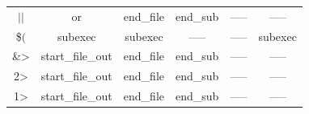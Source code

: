 \documentclass[12pt,a4paper]{report}
\begin{document}
\begin{table}[H]
\begin{tabular}{ |c|c|c|c|c|c| }
	$||$  & or & end\_file\cellcolor[HTML]{BEE9F9} &  end\_sub \cellcolor[HTML]{FFF49C}& ----- & ----- \\
	\$$($  & subexec\cellcolor[HTML]{C500FF} & subexec\cellcolor[HTML]{C500FF} &  ----- & ----- & subexec\cellcolor[HTML]{C500FF} \\
	\&>  & start\_file\_out \cellcolor[HTML]{BEE9F9}& end\_file \cellcolor[HTML]{BEE9F9}&  end\_sub \cellcolor[HTML]{FFF49C}& ----- & ----- \\
	2>  & start\_file\_out \cellcolor[HTML]{BEE9F9}& end\_file \cellcolor[HTML]{BEE9F9}&  end\_sub \cellcolor[HTML]{FFF49C}& ----- & ----- \\
	1>  & start\_file\_out \cellcolor[HTML]{BEE9F9}& end\_file \cellcolor[HTML]{BEE9F9}&  end\_sub \cellcolor[HTML]{FFF49C}& ----- & ----- \\
	\hline
\end{tabular}
\end{table}
\end{document}
